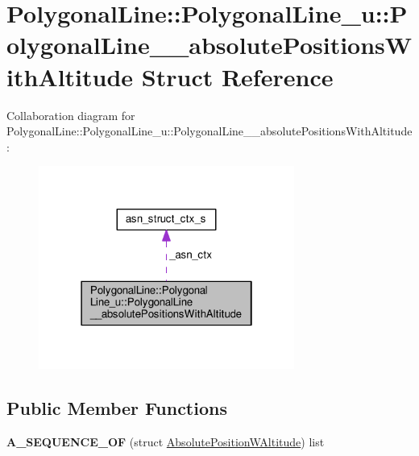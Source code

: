 \hypertarget{structPolygonalLine_1_1PolygonalLine__u_1_1PolygonalLine____absolutePositionsWithAltitude}{}\section{Polygonal\+Line\+:\+:Polygonal\+Line\+\_\+u\+:\+:Polygonal\+Line\+\_\+\+\_\+absolute\+Positions\+With\+Altitude Struct Reference}
\label{structPolygonalLine_1_1PolygonalLine__u_1_1PolygonalLine____absolutePositionsWithAltitude}


Collaboration diagram for Polygonal\+Line\+:\+:Polygonal\+Line\+\_\+u\+:\+:Polygonal\+Line\+\_\+\+\_\+absolute\+Positions\+With\+Altitude\+:\nopagebreak
\begin{figure}[H]
\begin{center}
\leavevmode
\includegraphics[width=238pt]{structPolygonalLine_1_1PolygonalLine__u_1_1PolygonalLine____absolutePositionsWithAltitude__coll__graph}
\end{center}
\end{figure}
\subsection*{Public Member Functions}
\begin{DoxyCompactItemize}
\item 
{\bfseries A\+\_\+\+S\+E\+Q\+U\+E\+N\+C\+E\+\_\+\+OF} (struct \hyperlink{structAbsolutePositionWAltitude}{Absolute\+Position\+W\+Altitude}) list\hypertarget{structPolygonalLine_1_1PolygonalLine__u_1_1PolygonalLine____absolutePositionsWithAltitude_a0abfc5095fd7adbd4758ce963d34d004}{}\label{structPolygonalLine_1_1PolygonalLine__u_1_1PolygonalLine____absolutePositionsWithAltitude_a0abfc5095fd7adbd4758ce963d34d004}

\end{DoxyCompactItemize}
